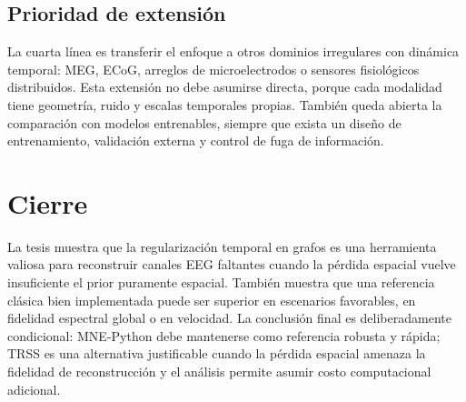 \subsection*{Prioridad de extensión}

La cuarta línea es transferir el enfoque a otros dominios irregulares con dinámica temporal: MEG, ECoG, arreglos de microelectrodos o sensores fisiológicos distribuidos. Esta extensión no debe asumirse directa, porque cada modalidad tiene geometría, ruido y escalas temporales propias. También queda abierta la comparación con modelos entrenables, siempre que exista un diseño de entrenamiento, validación externa y control de fuga de información.

\section{Cierre}

La tesis muestra que la regularización temporal en grafos es una herramienta valiosa para reconstruir canales EEG faltantes cuando la pérdida espacial vuelve insuficiente el prior puramente espacial. También muestra que una referencia clásica bien implementada puede ser superior en escenarios favorables, en fidelidad espectral global o en velocidad. La conclusión final es deliberadamente condicional: MNE-Python debe mantenerse como referencia robusta y rápida; TRSS es una alternativa justificable cuando la pérdida espacial amenaza la fidelidad de reconstrucción y el análisis permite asumir costo computacional adicional.
